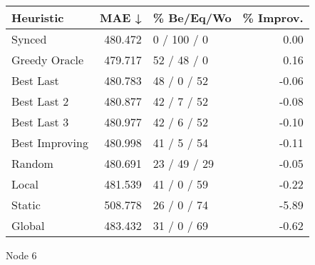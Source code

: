 \begin{tabular}{lrlr}
\toprule
\textbf{Heuristic} & \textbf{MAE ↓} & \textbf{\% Be/Eq/Wo} & \textbf{\% Improv.} \\
\midrule
            Synced &        480.472 &          0 / 100 / 0 &                0.00 \\
     Greedy Oracle &        479.717 &          52 / 48 / 0 &                0.16 \\
         Best Last &        480.783 &          48 / 0 / 52 &               -0.06 \\
       Best Last 2 &        480.877 &          42 / 7 / 52 &               -0.08 \\
       Best Last 3 &        480.977 &          42 / 6 / 52 &               -0.10 \\
    Best Improving &        480.998 &          41 / 5 / 54 &               -0.11 \\
            Random &        480.691 &         23 / 49 / 29 &               -0.05 \\
             Local &        481.539 &          41 / 0 / 59 &               -0.22 \\
            Static &        508.778 &          26 / 0 / 74 &               -5.89 \\
            Global &        483.432 &          31 / 0 / 69 &               -0.62 \\
\bottomrule
\end{tabular}
\caption{Node 6}
\label{tab:iid_lr01_le2_bs4_6}
